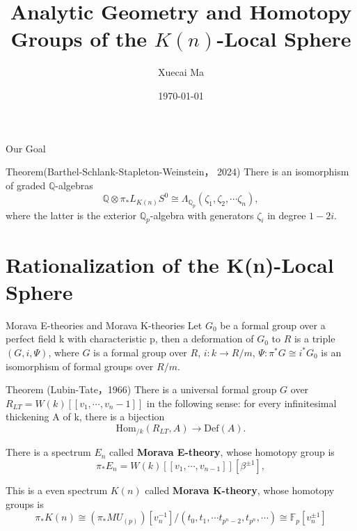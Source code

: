 \documentclass[aspectratio=1610]{ctexbeamer}
\title{Analytic Geometry and Homotopy Groups  of the $K(n)$-Local Sphere}
\author{ Xuecai Ma}
\date{\today}
\def  \Hom      {\mathrm{Hom}}
\def  \bq       {\mathbb{Q}}
\begin{document}
\maketitle



\begin{frame}{Our Goal}
	
	\begin{alertblock}{Theorem(Barthel-Schlank-Stapleton-Weinstein， 2024)}
		There is an isomorphism of graded $\bq$-algebras
		$$
		\bq \otimes \pi_* L_{K(n)}S^0  \cong  \Lambda_{\bq_p}(\zeta_1, \zeta_2, \dotsm \zeta_n),
		$$
		where the latter is the exterior $\bq_p$-algebra  with generators $\zeta_i$ in degree $1-2i$.
	\end{alertblock}
\end{frame}




\begin{frame}
\tableofcontents
\end{frame}



\section{Rationalization of the K(n)-Local Sphere}

\begin{frame}{Morava E-theories and Morava K-theories}
	Let $G_0$ be a formal group over a perfect field k with characteristic p, then a deformation of $G_0$ to $R$ is a triple $(G,i, \Psi)$, where $G$ is a formal group over $R$, $i: k \to R/m$,  $\Psi : \pi^* G \cong i ^* G_0$  is an isomorphism of formal groups over $R/m$.
	
	
	
	\begin{alertblock}{Theorem (Lubin-Tate，1966)}
		There is a universal formal group $G$ over $R_{LT}= W(k)[[v_1, \cdots,v_n-1]]$ in the following sense: for every infinitesimal thickening A of k, there is a bijection
		$$
		\Hom_{/ k}(R_{LT},A) \to \mathrm{Def}(A).
		$$
	\end{alertblock}
	
	
	There is a spectrum $E_n$  called \textbf{Morava E-theory}, whose homotopy group is
	$$
	\pi_* E_n=W(k)[\![ v_1, \cdots, v_{n-1}]\!][\beta ^{\pm 1}], 
	$$
	
	This is a even spectrum $K(n)$ called \textbf{Morava K-theory}, whose homotopy groups  is
	$$
	\pi_*K(n) \cong (\pi_* MU_{(p)})[v_n^{-1}]/ (t_0, t_1, \cdots t_{p^n-2},t_{p^n}, \cdots) \cong \mathbb{F}_p[v_n ^{\pm 1}]
	$$
	
\end{frame}
\end{document}
